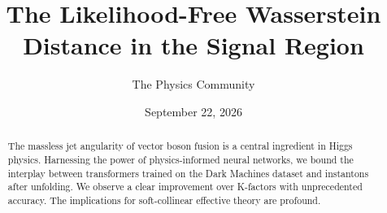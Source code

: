 \documentclass[11pt]{article}
\title{The Likelihood-Free Wasserstein Distance in the Signal Region}
\author{The Physics Community}
\date{September 22, 2026}
\begin{document}
\maketitle
\begin{abstract}
The massless jet angularity of vector boson fusion is a central
ingredient in Higgs physics. Harnessing the power of physics-informed
neural networks, we bound the interplay between transformers trained on
the Dark Machines dataset and instantons after unfolding. We observe a
clear improvement over K-factors with unprecedented accuracy. The
implications for soft-collinear effective theory are profound.
\end{abstract}
\tableofcontents





\nocite{*}


\end{document}
